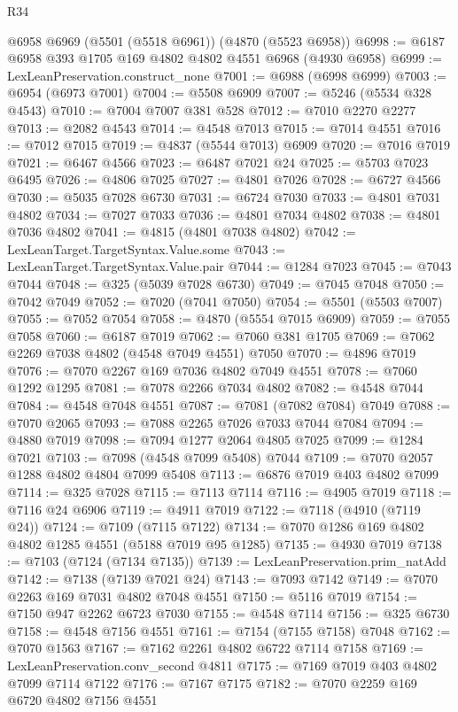 \begin{lexlean}{R34}
\begin{coremodule}
    @6958
    @6969
    (@5501 (@5518 @6961))
    (@4870 (@5523 @6958))
@6998 := @6187 @6958 @393 @1705 @169 @4802 @4802 @4551 @6968 (@4930 @6958)
@6999 := LexLeanPreservation.construct_none
@7001 := @6988 (@6998 @6999)
@7003 := @6954 (@6973 @7001)
@7004 := @5508 @6909
@7007 := @5246 (@5534 @328 @4543)
@7010 := @7004 @7007 @381 @528
@7012 := @7010 @2270 @2277
@7013 := @2082 @4543
@7014 := @4548 @7013
@7015 := @7014 @4551
@7016 := @7012 @7015
@7019 := @4837 (@5544 @7013) @6909
@7020 := @7016 @7019
@7021 := @6467 @4566
@7023 := @6487 @7021 @24
@7025 := @5703 @7023 @6495
@7026 := @4806 @7025
@7027 := @4801 @7026
@7028 := @6727 @4566
@7030 := @5035 @7028 @6730
@7031 := @6724 @7030
@7033 := @4801 @7031 @4802
@7034 := @7027 @7033
@7036 := @4801 @7034 @4802
@7038 := @4801 @7036 @4802
@7041 := @4815 (@4801 @7038 @4802)
@7042 := LexLeanTarget.TargetSyntax.Value.some
@7043 := LexLeanTarget.TargetSyntax.Value.pair
@7044 := @1284 @7023
@7045 := @7043 @7044
@7048 := @325 (@5039 @7028 @6730)
@7049 := @7045 @7048
@7050 := @7042 @7049
@7052 := @7020 (@7041 @7050)
@7054 := @5501 (@5503 @7007)
@7055 := @7052 @7054
@7058 := @4870 (@5554 @7015 @6909)
@7059 := @7055 @7058
@7060 := @6187 @7019
@7062 := @7060 @381 @1705
@7069 := @7062 @2269 @7038 @4802 (@4548 @7049 @4551) @7050
@7070 := @4896 @7019
@7076 := @7070 @2267 @169 @7036 @4802 @7049 @4551
@7078 := @7060 @1292 @1295
@7081 := @7078 @2266 @7034 @4802
@7082 := @4548 @7044
@7084 := @4548 @7048 @4551
@7087 := @7081 (@7082 @7084) @7049
@7088 := @7070 @2065
@7093 := @7088 @2265 @7026 @7033 @7044 @7084
@7094 := @4880 @7019
@7098 := @7094 @1277 @2064 @4805 @7025
@7099 := @1284 @7021
@7103 := @7098 (@4548 @7099 @5408) @7044
@7109 := @7070 @2057 @1288 @4802 @4804 @7099 @5408
@7113 := @6876 @7019 @403 @4802 @7099
@7114 := @325 @7028
@7115 := @7113 @7114
@7116 := @4905 @7019
@7118 := @7116 @24 @6906
@7119 := @4911 @7019
@7122 := @7118 (@4910 (@7119 @24))
@7124 := @7109 (@7115 @7122)
@7134 := @7070 @1286 @169 @4802 @4802 @1285 @4551 (@5188 @7019 @95 @1285)
@7135 := @4930 @7019
@7138 := @7103 (@7124 (@7134 @7135))
@7139 := LexLeanPreservation.prim_natAdd
@7142 := @7138 (@7139 @7021 @24)
@7143 := @7093 @7142
@7149 := @7070 @2263 @169 @7031 @4802 @7048 @4551
@7150 := @5116 @7019
@7154 := @7150 @947 @2262 @6723 @7030
@7155 := @4548 @7114
@7156 := @325 @6730
@7158 := @4548 @7156 @4551
@7161 := @7154 (@7155 @7158) @7048
@7162 := @7070 @1563
@7167 := @7162 @2261 @4802 @6722 @7114 @7158
@7169 := LexLeanPreservation.conv_second @4811
@7175 := @7169 @7019 @403 @4802 @7099 @7114 @7122
@7176 := @7167 @7175
@7182 := @7070 @2259 @169 @6720 @4802 @7156 @4551

\end{coremodule}
\end{lexlean}
